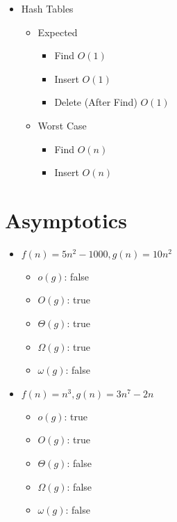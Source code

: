 \documentclass[11pt]{article}
\begin{document}
\begin{itemize}
        \item Hash Tables
            \begin{itemize}
                \item Expected
                    \begin{itemize}
                        \item Find $O\left( 1 \right) $ 
                        \item Insert $O\left( 1 \right) $ 
                        \item Delete (After Find) $O\left( 1 \right) $
                    \end{itemize}
                \item Worst Case
                    \begin{itemize}
                        \item Find $O\left( n \right) $ 
                        \item Insert $O\left( n \right) $ 
                    \end{itemize}
            \end{itemize}


    \end{itemize}

    \newpage
    \section{Asymptotics}

        \begin{itemize}
            \item $f\left( n \right) =  5n^2 - 1000, g\left( n \right) = 10n^2$
                \begin{itemize}
                    \item $o\left( g \right) $: false
                    \item $O\left( g \right) $: true
                    \item $\Theta \left( g \right) $: true
                    \item $\Omega\left( g \right) $: true
                    \item $\omega\left( g \right) $: false 
                \end{itemize}
        \end{itemize}
        
        \begin{itemize}
            \item $f\left( n \right) =  n^3, g\left( n \right) = 3n^7 - 2n$
                \begin{itemize}
                    \item $o\left( g \right) $: true
                    \item $O\left( g \right) $: true
                    \item $\Theta \left( g \right) $: false
                    \item $\Omega\left( g \right) $: false
                    \item $\omega\left( g \right) $: false 
                \end{itemize}
        \end{itemize}
\end{document}
